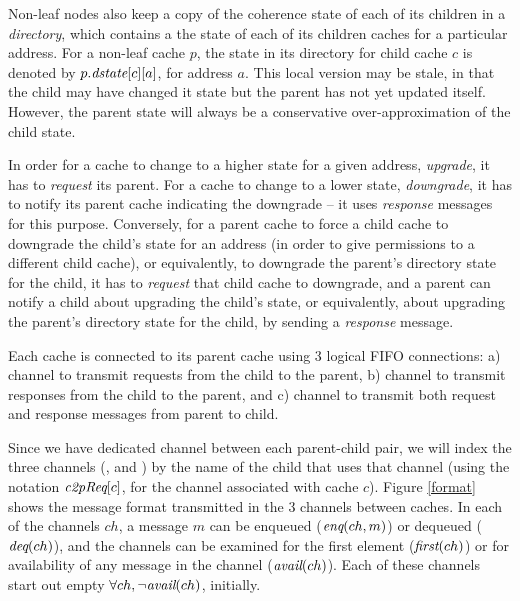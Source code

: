 Non-leaf nodes also keep a copy of the coherence state of each of its
children in a \emph{directory}, which contains a the state of each of
its children caches for a particular address. For a non-leaf cache
$p$, the state in its directory for child cache $c$ is denoted by
$p.\textit{dstate}[c][a]$, for address $a$. This local version may be stale,
in that the child may have changed it state but the parent has not yet
updated itself. However, the parent state will always be a
conservative over-approximation of the child state.

In order for a cache to change to a higher state for a given address,
\ie{} \emph{upgrade}, it has to \emph{request} its parent.  For a
cache to change to a lower state, \ie \emph{downgrade}, it has to
notify its parent cache indicating the downgrade -- it uses
\emph{response} messages for this purpose. Conversely, for a parent
cache to force a child cache to downgrade the child's state for an
address (in order to give permissions to a different child cache), or
equivalently, to downgrade the parent's directory state for the child,
it has to \emph{request} that child cache to downgrade, and a parent
can notify a child about upgrading the child's state, or equivalently,
about upgrading the parent's directory state for the child, by sending
a \emph{response} message.

Each cache is connected to its parent cache using 3 logical FIFO
connections: a) \cpReq{} channel to transmit requests from the child
to the parent, b) \cpResp{} channel to transmit responses from the
child to the parent, and c) \pc{} channel to transmit both request and
response messages from parent to child. 

Since we have dedicated channel between each parent-child pair, we
will index the three channels (\cpReq{}, \cpResp{} and \pc{}) by the
name of the child that uses that channel (using the notation
$\textit{c2pReq}[c]$, \etc for the \cpReq{} channel associated with cache $c$).
Figure \ref{format} shows the message format transmitted in the 3
channels between caches. In each of the channels $ch$, a message $m$
can be enqueued ($\textit{enq}(ch, m)$) or dequeued ($\textit{deq}(ch)$), and the
channels can be examined for the first element ($\textit{first}(ch)$) or for
availability of any message in the channel ($\textit{avail}(ch)$).  Each of
these channels start out empty \ie $\forall ch, \neg \textit{avail}(ch)$,
initially.

